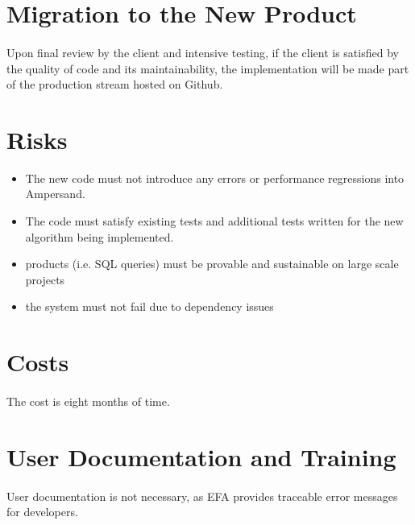 \documentclass[12pt]{report}
\begin{document}
\section{Migration to the New Product}\label{sec:Migration}
\paragraph*{}
Upon final review by the client and intensive testing, if the client is
satisfied by the quality of code and its maintainability, the implementation
will be made part of the production stream hosted on Github.  
\section{Risks}\label{sec:Risks}
\begin{itemize}
\item The new code must not introduce any errors or performance regressions
into Ampersand.
\item The code must satisfy existing tests and 
additional tests written for the new algorithm being implemented.
\item products (i.e. SQL queries) must be provable and sustainable on large 
scale projects
\item the system must not fail due to dependency issues
\end{itemize}

\section{Costs}\label{sec:Costs}
\paragraph*{}
The cost is eight months of time.

\section{User Documentation and Training}\label{sec:UserDoc}
\paragraph*{}
User documentation is not necessary, as EFA provides traceable error messages 
for developers. 




\end{document}
